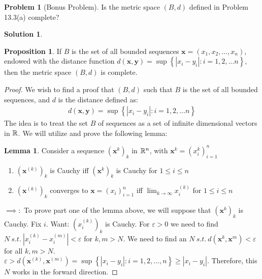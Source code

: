 \documentclass[12pt]{article}
\theoremstyle{definition} %
\newtheorem{solution}{Solution}
\newtheorem*{proposition}{Proposition}
\newtheorem{problem}{Problem}
\newtheorem{lemma}{Lemma}
\theoremstyle{plain} %
\begin{document}
\begin{problem}[Bonus Problem]
    Is the metric space $(B,d)$ defined in Problem 13.3(a) complete?
\end{problem}

\begin{solution}
    \begin{proposition}
        If $B$ is the set of all bounded sequences $\mathbf{x} = (x_{1}, x_{2}, \ldots, x_n )$, endowed with the distance function $d(\mathbf{x}, \mathbf{y})=\sup \left\{ \left\vert x_i - y_{i} \right\vert : i=1,2, \ldots n \right\}$, then the metric space $(B,d)$ is complete.
    \end{proposition}
    \begin{proof}

        We wish to find a proof that $(B, d)$ such that $B$ is the set of all bounded sequences, and $d$ is the distance defined as:
        \begin{align}
            d(\mathbf{x}, \mathbf{y})=\sup \left\{ \left\vert x_i - y_{i} \right\vert : i=1,2, \ldots n \right\} 
        \end{align} 
        The idea is to treat the set $B$ of sequences as a set of infinite dimensional vectors in $\mathbb{\MakeUppercase{R}} $. 
        We will utilize and prove the following lemma: 
        \begin{lemma}
                Consider a sequence $(\mathbf{x}^{k})_k$ in $\mathbb{\MakeUppercase{r}}^n$, with $\mathbf{x}^{k}=(x_i^{k})^{n}_{i=1}$   
            \begin{enumerate}
                \item $(\textbf{x}^{(k)})_{k}$ is Cauchy iff $(\textbf{x}^{k})_{k}$  is Cauchy for $1 \leq i \leq n $
                \item $(\textbf{x}^{(k)})_{k}$ converges to $\mathbf{x} = (x_{i})^{n}_{i=1}$ iff $\lim_{k \to \infty} x_{i}^{(k)}$ for $1 \leq i \leq n $ 
            \end{enumerate} 
        \end{lemma}
        \noindent
       $\implies :$  To prove part one of the lemma above, we will suppose that $(\textbf{x}^{k})_{k}$ is Cauchy. Fix $i$. Want: $(x_{i}^{(k)})_{k}$ is Cauchy. For $\varepsilon > 0$ we need to find $N\ s.t. \ \left\vert x_{i}^{(k)} - x_{i}^{(m)} \right\vert <\varepsilon $ for $k, m>N$. We need to find an $N\ s.t. \ d(\mathbf{x}^{k}, \mathbf{x}^{m})<\varepsilon$ for all $k,m>N$. $\varepsilon > d(\mathbf{x}^{(k)}, \mathbf{x}^{(m)})=\sup \left\{ \left\vert  x_{i}- y_{i}\right\vert : i= 1,2, \ldots , n   \right\} \geq \left\vert x_{i}-y_{i} \right\vert $. Therefore, this $N$ works in the forward direction.

\end{proof}
\end{solution}
\end{document}
